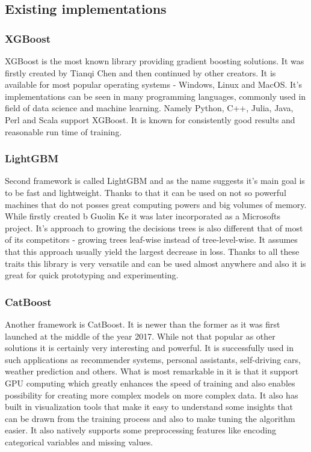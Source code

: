 \documentclass[a4paper,twoside,12pt]{book}
\begin{document}
\subsection{Existing implementations}

\subsubsection{XGBoost}

XGBoost\cite{chen2016xgboost} is the most known library providing gradient boosting solutions. It was firstly created by Tianqi Chen and then continued by other creators. It is available for most popular operating systems - Windows, Linux and MacOS. It's implementations can be seen in many programming languages, commonly used in field of data science and machine learning. Namely Python, C++, Julia, Java, Perl and Scala support XGBoost. It is known for consistently good results and reasonable run time of training.


\subsubsection{LightGBM}

Second framework is called LightGBM\cite{ke2017lightgbm} and as the name suggests it's main goal is to be fast and lightweight. Thanks to that it can be used on not so powerful machines that do not posses great computing powers and big volumes of memory. While firstly created b Guolin Ke it was later incorporated as a Microsofts project. It's approach to growing the decisions trees is also different that of most of its competitors - growing trees leaf-wise instead of tree-level-wise. It assumes that this approach usually yield the largest decrease in loss. Thanks to all these traits this library is very versatile and can be used almost anywhere and also it is great for quick prototyping and experimenting. 

\subsubsection{CatBoost}

Another framework is CatBoost\cite{prokhorenkova2018catboost}. It is newer than the former as it was first launched at the middle of the year 2017. While not that popular as other solutions it is certainly very interesting and powerful. It is successfully used in such applications as recommender systems, personal assistants, self-driving cars, weather prediction and others. What is most remarkable in it is that it support GPU computing which greatly enhances the speed of training and also enables possibility for creating more complex models on more complex data. It also has built in visualization tools that make it easy to understand some insights that can be drawn from the training process and also to make tuning the algorithm easier. It also natively supports some preprocessing features like encoding categorical variables and missing values.
\end{document}
